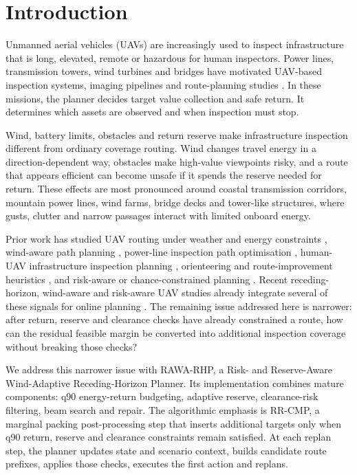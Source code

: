 \documentclass[preprint,12pt]{elsarticle}
\begin{document}

\section{Introduction}

Unmanned aerial vehicles (UAVs) are increasingly used to inspect infrastructure that is long, elevated, remote or hazardous for human inspectors. Power lines, transmission towers, wind turbines and bridges have motivated UAV-based inspection systems, imaging pipelines and route-planning studies \cite{Shakhatreh_2019,Khaloo_2017,Dorafshan_Maguire_2018,Dorafshan_2018,Kim_2018,Car_2020,Zhang_2024,Ahmed_2024,Yin_2022}. In these missions, the planner decides target value collection and safe return. It determines which assets are observed and when inspection must stop.

Wind, battery limits, obstacles and return reserve make infrastructure inspection different from ordinary coverage routing. Wind changes travel energy in a direction-dependent way, obstacles make high-value viewpoints risky, and a route that appears efficient can become unsafe if it spends the reserve needed for return. These effects are most pronounced around coastal transmission corridors, mountain power lines, wind farms, bridge decks and tower-like structures, where gusts, clutter and narrow passages interact with limited onboard energy.

Prior work has studied UAV routing under weather and energy constraints \cite{Thibbotuwawa_2019}, wind-aware path planning \cite{Thanellas_2019,Li_2024,Lian_2025,Gu_2026}, power-line inspection path optimisation \cite{Wu_2022,Li_AStar_2024}, human-UAV infrastructure inspection planning \cite{Pan_2024}, orienteering and route-improvement heuristics \cite{Vansteenwegen_2011,Ropke_2006,Mattos_Ribeiro_2012,Sacramento_2019}, and risk-aware or chance-constrained planning \cite{Blackmore_2011,Song_2018,Cai_2021,Nakka_2023,VeigaPineiro_2025,Qiu_2026}. Recent receding-horizon, wind-aware and risk-aware UAV studies already integrate several of these signals for online planning \cite{Ahmed_Sheltami_2024,Hu_2026,Gu_2026}. The remaining issue addressed here is narrower: after return, reserve and clearance checks have already constrained a route, how can the residual feasible margin be converted into additional inspection coverage without breaking those checks?

We address this narrower issue with RAWA-RHP, a Risk- and Reserve-Aware Wind-Adaptive Receding-Horizon Planner. Its implementation combines mature components: q90 energy-return budgeting, adaptive reserve, clearance-risk filtering, beam search and repair. The algorithmic emphasis is RR-CMP, a marginal packing post-processing step that inserts additional targets only when q90 return, reserve and clearance constraints remain satisfied. At each replan step, the planner updates state and scenario context, builds candidate route prefixes, applies those checks, executes the first action and replans.
\end{document}
